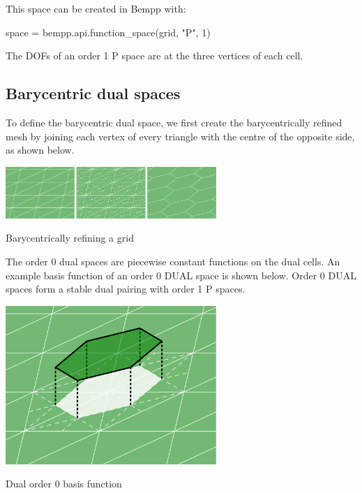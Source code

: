 \documentclass[a4paper]{book}
\begin{document}
This space can be created in Bempp with:

\begin{python}
space = bempp.api.function_space(grid, "P", 1)
\end{python}

The DOFs of an order 1 P space are at the three vertices of each cell.

\subsection{ Barycentric dual spaces}To define the barycentric dual space, we first create the barycentrically refined mesh by joining
each vertex of every triangle with the centre of the opposite side, as shown below.
\begin{center}
\includegraphics[width=0.6\textwidth]{../img/barycentric_mesh.png}

\footnotesize{Barycentrically refining a grid}\end{center}

The order 0 dual spaces are piecewise constant functions on the dual cells.
An example basis function of an order 0 DUAL space is shown below.
Order 0 DUAL spaces form a stable dual pairing with order 1 P spaces.
\begin{center}
\includegraphics[width=0.6\textwidth]{../img/dual0.png}

\footnotesize{Dual order 0 basis function}\end{center}
\end{document}
